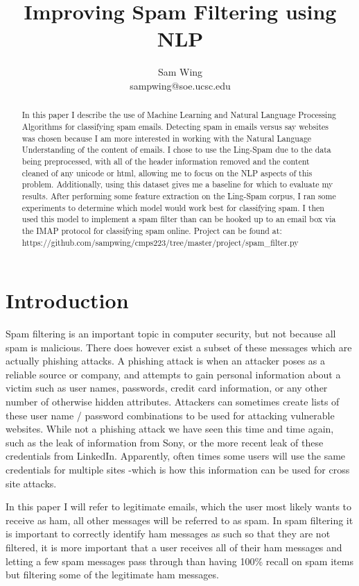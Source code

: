 \documentclass[12pt]{amsart}
\title{Improving Spam Filtering using NLP}
\author{Sam Wing \\ sampwing@soe.ucsc.edu}
\date{} %
\begin{document}
\maketitle

\begin{abstract}
In this paper I describe the use of Machine Learning and Natural Language Processing Algorithms for classifying spam emails. Detecting spam in emails versus say websites was chosen because I am more interested in working with the Natural Language Understanding of the content of emails. I chose to use the Ling-Spam \cite{bayesianfiltering} due to the data being preprocessed, with all of the header information removed and the content cleaned of any unicode or html, allowing me to focus on the NLP aspects of this problem. Additionally, using this dataset gives me a baseline for which to evaluate my results. After performing some feature extraction on the Ling-Spam corpus, I ran some experiments to determine which model would work best for classifying spam.  I then used this model to implement a spam filter than can be hooked up to an email box via the IMAP protocol for classifying spam online. Project can be found at: \\https://github.com/sampwing/cmps223/tree/master/project/spam\_filter.py
\end{abstract}

\section{Introduction}
Spam filtering is an important topic in computer security, but not because all spam is malicious.  There does however exist a subset of these messages which are actually phishing attacks.  A phishing attack\cite{wikiphishing} is when an attacker poses as a reliable source or company, and attempts to gain personal information about a victim such as user names, passwords, credit card information, or any other number of otherwise hidden attributes.  Attackers can sometimes create lists of these user name / password combinations to be used for attacking vulnerable websites.  While not a phishing attack we have seen this time and time again, such as the leak of information from Sony, or the more recent leak of these credentials from LinkedIn.  Apparently, often times some users will use the same credentials for multiple sites -which is how this information can be used for cross site attacks.

In this paper I will refer to legitimate emails, which the user most likely wants to receive as ham, all other messages will be referred to as spam.  In spam filtering it is important to correctly identify ham messages as such so that they are not filtered, it is more important that a user receives all of their ham messages and letting a few spam messages pass through than having 100\% recall on spam items but filtering some of the legitimate ham messages.
\end{document}
